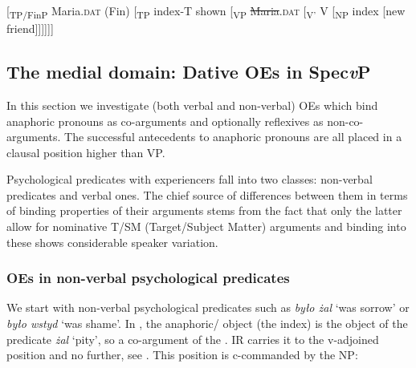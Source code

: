 \documentclass[output=paper,nonflat,colorlinks,citecolor=brown,newtxmath]{langsci/langscibook}
\begin{document}
\ea \label{ex:witkos:33}
{[\textsubscript{TP/FinP} Maria.\textsc{dat} (Fin) [\textsubscript{TP} index-T shown [\textsubscript{VP} \sout{Maria}.\textsc{dat} [\textsubscript{V’} V [\textsubscript{NP} index [new friend]]]]]]}\\
\z

\subsection{The medial domain: Dative OEs in Spec\textit{v}P}\label{s3.2}

In this section we investigate (both verbal and non-verbal)  OEs which bind anaphoric pronouns as co-arguments and optionally  reflexives as non-co-arguments. The successful antecedents to anaphoric pronouns are all placed in a clausal position higher than VP.

Psychological predicates with  experiencers fall into two classes: non-verbal predicates and verbal ones. The chief source of differences between them in terms of binding properties of their  arguments stems from the fact that only the latter allow for nominative T/SM (Target/Subject Matter) arguments and binding into these shows considerable speaker variation.


\subsubsection{OEs in non-verbal psychological predicates}\label{s3.2.1}

We start with non-verbal psychological predicates such as \textit{było żal} ‘was sorrow’ or \textit{było wstyd} ‘was shame’. In , the anaphoric/ object (the index) is the object of the predicate \textit{żal}  ‘pity’, so a co-argument of the  . IR carries it to the v-adjoined position and no further, see . This position is c-commanded by the  NP:


\ea \label{ex:witkos:34}
	\z
\z
\end{document}
